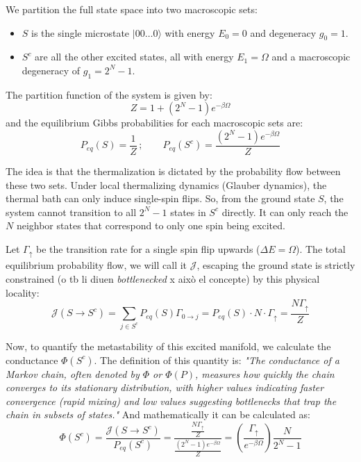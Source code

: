 \documentclass{article}
\begin{document}
We partition the full state space into two macroscopic sets:
\begin{itemize}
    \item $S$ is the single microstate $|00\dots0\rangle$ with energy $E_0 = 0$ and degeneracy $g_0 = 1$.
    \item $S^c$ are all the other excited states, all with energy $E_1 = \Omega$ and a macroscopic degeneracy of $g_1 = 2^N - 1$.
\end{itemize}

The partition function of the system is given by:
\begin{equation}
    Z = 1 + (2^N - 1)e^{-\beta \Omega}
\end{equation}
and the equilibrium Gibbs probabilities for each macroscopic sets are:
\begin{equation}
    P_{eq}(S) = \frac{1}{Z}\,; \quad \quad P_{eq}(S^c) = \frac{(2^N - 1)e^{-\beta \Omega}}{Z}
\end{equation}

The idea is that the thermalization is dictated by the probability flow between these two sets. Under local thermalizing dynamics (Glauber dynamics), the thermal bath can only induce single-spin flips. So, from the ground state $S$, the system cannot transition to all $2^N - 1$ states in $S^c$ directly. It can only reach the $N$ neighbor states that correspond to only one spin being excited.

Let $\Gamma_{\uparrow}$ be the transition rate for a single spin flip upwards ($\Delta E = \Omega$). The total equilibrium probability flow, we will call it $\mathcal{J}$, escaping the ground state is strictly constrained (o tb li diuen \textit{bottlenecked} x això el concepte) by this physical locality:
\begin{equation}
    \mathcal{J}(S \to S^c) = \sum_{j \in S^c} P_{eq}(S) \Gamma_{0 \to j} = P_{eq}(S) \cdot N \cdot \Gamma_{\uparrow} = \frac{N \Gamma_{\uparrow}}{Z}
\end{equation}

Now, to quantify the metastability of this excited manifold, we calculate the conductance $\Phi(S^c)$. The definition of this quantity is: \textit{"The conductance of a Markov chain, often denoted by $\Phi$ or $\Phi(P)$, measures how quickly the chain converges to its stationary distribution, with higher values indicating faster convergence (rapid mixing) and low values suggesting bottlenecks that trap the chain in subsets of states."} And mathematically it can be calculated as:
\begin{equation}
    \Phi(S^c) = \frac{\mathcal{J}(S \to S^c)}{P_{eq}(S^c)} = \frac{\frac{N \Gamma_{\uparrow}}{Z}}{\frac{(2^N - 1)e^{-\beta \Omega}}{Z}} = \left( \frac{\Gamma_{\uparrow}}{e^{-\beta \Omega}} \right) \frac{N}{2^N - 1}
\end{equation}
\end{document}
